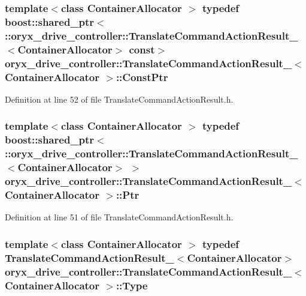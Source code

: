 \subsubsection[{\-Const\-Ptr}]{\setlength{\rightskip}{0pt plus 5cm}template$<$class Container\-Allocator $>$ typedef boost\-::shared\-\_\-ptr$<$ \-::{\bf oryx\-\_\-drive\-\_\-controller\-::\-Translate\-Command\-Action\-Result\-\_\-}$<$\-Container\-Allocator$>$ const$>$ {\bf oryx\-\_\-drive\-\_\-controller\-::\-Translate\-Command\-Action\-Result\-\_\-}$<$ \-Container\-Allocator $>$\-::{\bf \-Const\-Ptr}}\label{structoryx__drive__controller_1_1TranslateCommandActionResult___a0f52abb2b6a079abc4daade23299f159}


\-Definition at line 52 of file \-Translate\-Command\-Action\-Result.\-h.

\subsubsection[{\-Ptr}]{\setlength{\rightskip}{0pt plus 5cm}template$<$class Container\-Allocator $>$ typedef boost\-::shared\-\_\-ptr$<$ \-::{\bf oryx\-\_\-drive\-\_\-controller\-::\-Translate\-Command\-Action\-Result\-\_\-}$<$\-Container\-Allocator$>$ $>$ {\bf oryx\-\_\-drive\-\_\-controller\-::\-Translate\-Command\-Action\-Result\-\_\-}$<$ \-Container\-Allocator $>$\-::{\bf \-Ptr}}\label{structoryx__drive__controller_1_1TranslateCommandActionResult___a4bc5483c0b6e5384a8d15aa81d1a60ce}


\-Definition at line 51 of file \-Translate\-Command\-Action\-Result.\-h.

\subsubsection[{\-Type}]{\setlength{\rightskip}{0pt plus 5cm}template$<$class Container\-Allocator $>$ typedef {\bf \-Translate\-Command\-Action\-Result\-\_\-}$<$\-Container\-Allocator$>$ {\bf oryx\-\_\-drive\-\_\-controller\-::\-Translate\-Command\-Action\-Result\-\_\-}$<$ \-Container\-Allocator $>$\-::{\bf \-Type}}\label{structoryx__drive__controller_1_1TranslateCommandActionResult___ab5d74cd2df2664898b3167db241443de}


